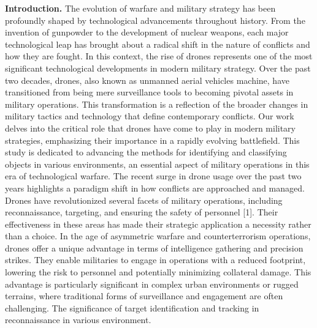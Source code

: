 \textbf{Introduction.} The evolution of warfare and military strategy
has been profoundly shaped by technological advancements throughout
history. From the invention of gunpowder to the development of nuclear
weapons, each major technological leap has brought about a radical shift
in the nature of conflicts and how they are fought. In this context, the
rise of drones represents one of the most significant technological
developments in modern military strategy. Over the past two decades,
drones, also known as unmanned aerial vehicles machine, have
transitioned from being mere surveillance tools to becoming pivotal
assets in military operations. This transformation is a reflection of
the broader changes in military tactics and technology that define
contemporary conflicts. Our work delves into the critical role that
drones have come to play in modern military strategies, emphasizing
their importance in a rapidly evolving battlefield. This study is
dedicated to advancing the methods for identifying and classifying
objects in various environments, an essential aspect of military
operations in this era of technological warfare. The recent surge in
drone usage over the past two years highlights a paradigm shift in how
conflicts are approached and managed. Drones have revolutionized several
facets of military operations, including reconnaissance, targeting, and
ensuring the safety of personnel {[}1{]}. Their effectiveness in these
areas has made their strategic application a necessity rather than a
choice. In the age of asymmetric warfare and counterterrorism
operations, drones offer a unique advantage in terms of intelligence
gathering and precision strikes. They enable militaries to engage in
operations with a reduced footprint, lowering the risk to personnel and
potentially minimizing collateral damage. This advantage is particularly
significant in complex urban environments or rugged terrains, where
traditional forms of surveillance and engagement are often challenging.
The significance of target identification and tracking in reconnaissance
in various environment.


